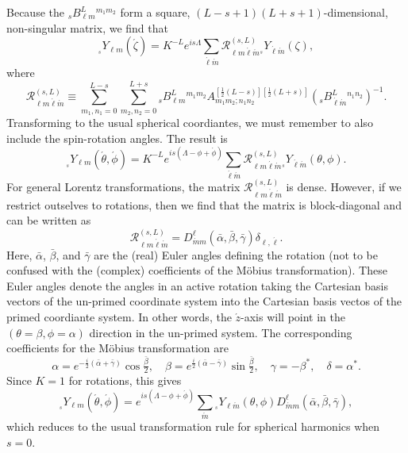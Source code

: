 \documentclass[11pt]{article}
\newcommand{\swY}[4][]{{}_{{}_{#2}}\!Y^{#1}_{#3}(#4)}
\begin{document}
Because the ${}_sB^L_{\ell m}{}^{m_1m_2}$ form a square,
$(L-s+1)(L+s+1)$-dimensional, non-singular matrix, we find that
\begin{equation}
\swY{s}{\ell m}{\acute\zeta}=K^{-L}e^{is\Lambda}\sum_{\acute\ell\acute{m}}
         \mathcal{R}^{(s,L)}_{\ell m\acute\ell\acute{m}}
         \swY{s}{\acute\ell\acute{m}}{\zeta},
\end{equation}
where
\begin{equation}
  \mathcal{R}^{(s,L)}_{\ell m\acute\ell\acute{m}}\equiv
    \sum_{m_1,n_1=0}^{L-s} \sum_{m_2,n_2=0}^{L+s}
         {}_sB^L_{\ell m}{}^{m_1m_2}
         A^{[\frac12(L-s)][\frac12(L+s)]}_{m_1m_2;n_1n_2}
         \left( {}_sB^L_{\acute\ell\acute{m}}{}^{n_1n_2}\right)^{-1}.
\end{equation}
Transforming to the usual spherical coordiantes, we must remember to also
include the spin-rotation angles.  The result is
\begin{equation}\label{eq:LorentzYTrans}
\swY{s}{\ell m}{\acute\theta,\acute\phi}=
     K^{-L}e^{is(\Lambda-\phi+\acute\phi)}\sum_{\acute\ell\acute{m}}
         \mathcal{R}^{(s,L)}_{\ell m\acute\ell\acute{m}}
                 \swY{s}{\acute\ell\acute{m}}{\theta,\phi}.
\end{equation}
For general Lorentz transformations, the matrix
$\mathcal{R}^{(s,L)}_{\ell m\acute\ell\acute{m}}$ is dense.  However,
if we restrict outselves to rotations, then we find that the matrix is
block-diagonal and can be written as
\begin{equation}
  \mathcal{R}^{(s,L)}_{\ell m\acute\ell\acute{m}} = 
  D^\ell_{\acute{m}m}(\bar\alpha,\bar\beta,\bar\gamma)\delta_{\ell,\acute\ell}.
\end{equation}
Here, $\bar\alpha$, $\bar\beta$, and $\bar\gamma$ are the (real) Euler
angles defining the rotation (not to be confused with the (complex)
coefficients of the M\"{o}bius transformation).  These Euler angles
denote the angles in an active rotation taking the Cartesian basis
vectors of the un-primed coordinate system into the Cartesian basis
vectos of the primed coordiante system.  In other words, the
$\acute{z}$-axis will point in the $(\theta=\beta,\phi=\alpha)$
direction in the un-primed system.  The corresponding coefficients for
the M\"{o}bius transformation are
\begin{equation}
  \alpha = e^{-\frac{i}2(\bar\alpha+\bar\gamma)}\cos\tfrac{\bar\beta}2,
\quad
  \beta = e^{\frac{i}2(\bar\alpha-\bar\gamma)}\sin\tfrac{\bar\beta}2,
\quad
  \gamma = -\beta^*,
\quad
  \delta = \alpha^*. 
\end{equation}
Since $K=1$ for
rotations, this gives
\begin{equation}
\swY{s}{\ell m}{\acute\theta,\acute\phi}=
     e^{is(\Lambda-\phi+\acute\phi)}\sum_{\acute{m}}
         \swY{s}{\ell\acute{m}}{\theta,\phi}
         D^\ell_{\acute{m}m}(\bar\alpha,\bar\beta,\bar\gamma),
\end{equation}
which reduces to the usual transformation rule for spherical harmonics
when $s=0$.
\end{document}
